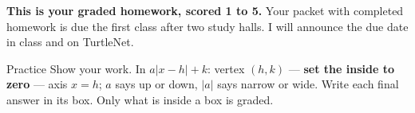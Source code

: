 \documentclass[10pt]{article}
\begin{document}

\begin{remindbox}
\small
\textbf{This is your graded homework, scored 1 to 5.} Your packet with completed homework is due the first
class after two study halls. I will announce the due date in class and on TurtleNet.
\end{remindbox}

\begin{notesbox}{Practice}
Show your work. In $a|x-h|+k$: vertex $(h,k)$ --- \textbf{set the inside to zero} --- axis $x=h$;
$a$ says up or down, $|a|$ says narrow or wide. Write each final answer in its box. Only what is inside a box is graded.


\end{notesbox}
\end{document}
